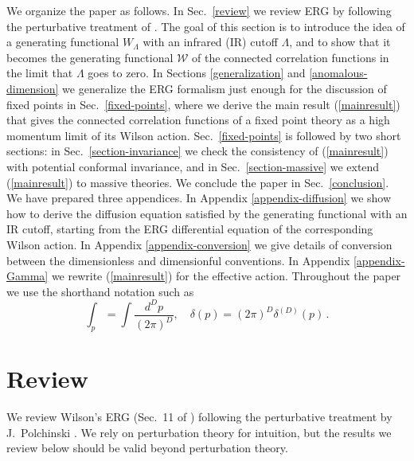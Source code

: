 \documentclass[aps,prd,preprint,groupedaddress,preprintnumbers,longbibliography]{revtex4-1}
\newcommand{\WW}{\mathcal{W}}
\begin{document}
We organize the paper as follows.  In Sec.~\ref{review} we review ERG
by following the perturbative treatment of \cite{Polchinski:1983gv}.
The goal of this section is to introduce the idea of a generating
functional $W_\Lambda$ with an infrared (IR) cutoff $\Lambda$, and to
show that it becomes the generating functional $\WW$ of the connected
correlation functions in the limit that $\Lambda$ goes to zero.  In
Sections \ref{generalization} and \ref{anomalous-dimension} we
generalize the ERG formalism just enough for the discussion of fixed
points in Sec.~\ref{fixed-points}, where we derive the main result
(\ref{mainresult}) that gives the connected correlation functions of a
fixed point theory as a high momentum limit of its Wilson action.
Sec.~\ref{fixed-points} is followed by two short sections: in
Sec.~\ref{section-invariance} we check the consistency of
(\ref{mainresult}) with potential conformal invariance, and in
Sec.~\ref{section-massive} we extend (\ref{mainresult}) to massive
theories.  We conclude the paper in Sec.~\ref{conclusion}.  We have
prepared three appendices.  In Appendix \ref{appendix-diffusion} we
show how to derive the diffusion equation satisfied by the generating
functional with an IR cutoff, starting from the ERG differential
equation of the corresponding Wilson action.  In Appendix
\ref{appendix-conversion} we give details of conversion between the
dimensionless and dimensionful conventions.  In Appendix
\ref{appendix-Gamma} we rewrite (\ref{mainresult}) for the effective
action.  Throughout the paper we use the shorthand notation such as
\begin{equation}
\int_p = \int \frac{d^D p}{(2 \pi)^D},\quad
\delta (p) = (2 \pi)^D \delta^{(D)} (p)\,.
\end{equation}

\section{Review\label{review}}


We review Wilson's ERG (Sec.~11 of \cite{Wilson:1973jj}) following the
perturbative treatment by J.~Polchinski \cite{Polchinski:1983gv}.  We
rely on perturbation theory for intuition, but the results we review
below should be valid beyond perturbation theory.
\end{document}
